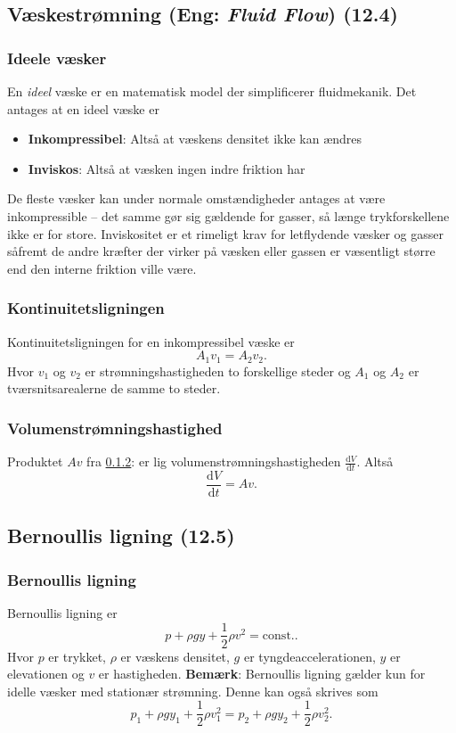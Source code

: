 \subsection{Væskestrømning (Eng: \textit{Fluid Flow}) (12.4)}

\subsubsection{Ideele væsker}
En \textit{ideel} væske er en matematisk model der simplificerer fluidmekanik. Det antages at en ideel væske er
\begin{itemize}
  \item \textbf{Inkompressibel}: Altså at væskens densitet ikke kan ændres
  \item \textbf{Inviskos}: Altså at væsken ingen indre friktion har
\end{itemize}
De fleste væsker kan under normale omstændigheder antages at være inkompressible -- det samme gør sig gældende for gasser, så længe trykforskellene ikke er for store. Inviskositet er et rimeligt krav for letflydende væsker og gasser såfremt de andre kræfter der virker på væsken eller gassen er væsentligt større end den interne friktion ville være.


\subsubsection{Kontinuitetsligningen} \label{afs:kontin}
Kontinuitetsligningen for en inkompressibel væske er
\[ 
A_1v_1 = A_2v_2
.\]
Hvor $v_1$ og $v_2$ er strømningshastigheden to forskellige steder og $A_1$ og $A_2$ er tværsnitsarealerne de samme to steder. 


\subsubsection{Volumenstrømningshastighed} \label{afs:volstr}
Produktet $Av$ fra \ref{afs:kontin}:  er lig volumenstrømningshastigheden $\frac{\mathrm{d}V}{\mathrm{d}t}$. Altså
\[ 
\frac{\mathrm{d}V}{\mathrm{d}t} = Av
.\]


\subsection{Bernoullis ligning (12.5)}

\subsubsection{Bernoullis ligning} \label{afs:bern}
Bernoullis ligning er
\[ 
  p + \rho gy + \frac{1}{2}\rho v^2 = \text{const.}
.\]
Hvor $p$ er trykket, $\rho$ er væskens densitet, $g$ er tyngdeaccelerationen, $y$ er elevationen og $v$ er hastigheden. \textbf{Bemærk}: Bernoullis ligning gælder kun for idelle væsker med stationær strømning. Denne kan også skrives som
\[ 
p_1 + \rho g y_1 + \frac{1}{2} \rho v_1^2 = p_2 + \rho g y_2 + \frac{1}{2} \rho v_2^2
.\]

